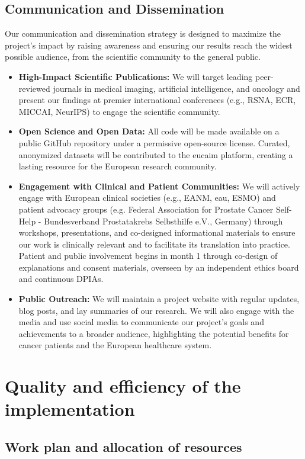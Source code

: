 \documentclass[11pt, a4paper]{article}
\begin{document}
\subsection{Communication and Dissemination}
Our communication and dissemination strategy is designed to maximize the project's impact by raising awareness and ensuring our results reach the widest possible audience, from the scientific community to the general public.
\begin{itemize}
    \item \textbf{High-Impact Scientific Publications:} We will target leading peer-reviewed journals in medical imaging, artificial intelligence, and oncology and present our findings at premier international conferences (e.g., RSNA, ECR, MICCAI, NeurIPS) to engage the scientific community.
    \item \textbf{Open Science and Open Data:} All code will be made available on a public GitHub repository under a permissive open-source license. Curated, anonymized datasets will be contributed to the \gls{eucaim} platform, creating a lasting resource for the European research community.
    \item \textbf{Engagement with Clinical and Patient Communities:} We will actively engage with European clinical societies (e.g., EANM, \gls{eau}, ESMO) and patient advocacy groups (e.g. Federal Association for Prostate Cancer Self-Help - Bundesverband Prostatakrebs Selbsthilfe e.V., Germany) through workshops, presentations, and co-designed informational materials to ensure our work is clinically relevant and to facilitate its translation into practice. Patient and public involvement begins in month 1 through co-design of explanations and consent materials, overseen by an independent ethics board and continuous DPIAs.  
    \item \textbf{Public Outreach:} We will maintain a project website with regular updates, blog posts, and lay summaries of our research. We will also engage with the media and use social media to communicate our project's goals and achievements to a broader audience, highlighting the potential benefits for cancer patients and the European healthcare system.
\end{itemize}

\section{Quality and efficiency of the implementation}


\subsection{Work plan and allocation of resources}
\end{document}
